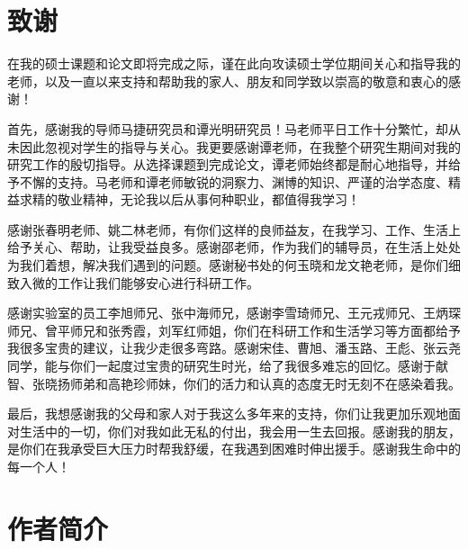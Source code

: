 \chapter[致谢]{致\quad 谢}%
\thispagestyle{noheaderstyle}%

在我的硕士课题和论文即将完成之际，谨在此向攻读硕士学位期间关心和指导我的老师，以及一直以来支持和帮助我的家人、朋友和同学致以崇高的敬意和衷心的感谢！

首先，感谢我的导师马捷研究员和谭光明研究员！马老师平日工作十分繁忙，却从未因此忽视对学生的指导与关心。我更要感谢谭老师，在我整个研究生期间对我的研究工作的殷切指导。从选择课题到完成论文，谭老师始终都是耐心地指导，并给予不懈的支持。马老师和谭老师敏锐的洞察力、渊博的知识、严谨的治学态度、精益求精的敬业精神，无论我以后从事何种职业，都值得我学习！

感谢张春明老师、姚二林老师，有你们这样的良师益友，在我学习、工作、生活上给予关心、帮助，让我受益良多。感谢邵老师，作为我们的辅导员，在生活上处处为我们着想，解决我们遇到的问题。感谢秘书处的何玉晓和龙文艳老师，是你们细致入微的工作让我们能够安心进行科研工作。

感谢实验室的员工李旭师兄、张中海师兄，感谢李雪琦师兄、王元戎师兄、王炳琛师兄、曾平师兄和张秀霞，刘军红师姐，你们在科研工作和生活学习等方面都给予我很多宝贵的建议，让我少走很多弯路。感谢宋佳、曹旭、潘玉路、王彪、张云尧同学，能与你们一起度过宝贵的研究生时光，给了我很多难忘的回忆。感谢于献智、张晓扬师弟和高艳珍师妹，你们的活力和认真的态度无时无刻不在感染着我。

最后，我想感谢我的父母和家人对于我这么多年来的支持，你们让我更加乐观地面对生活中的一切，你们对我如此无私的付出，我会用一生去回报。感谢我的朋友，是你们在我承受巨大压力时帮我舒缓，在我遇到困难时伸出援手。感谢我生命中的每一个人！




\cleardoublepage[plain]%


\chapter{作者简介}

